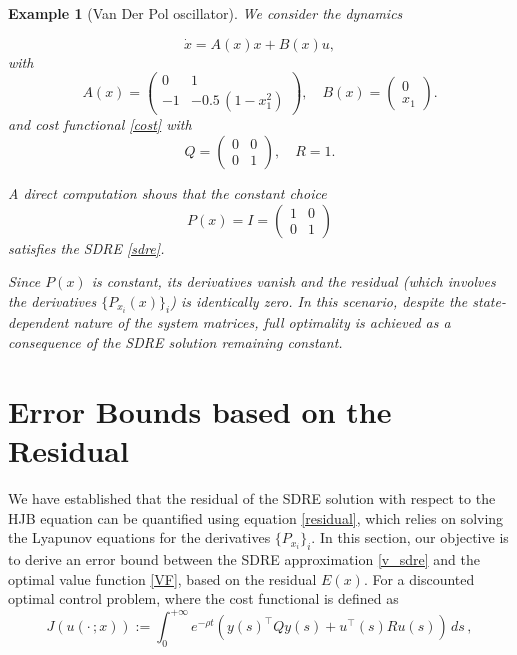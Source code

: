 \documentclass{article}
\newtheorem{example}{Example}[section]
\begin{document}
\begin{example}[Van Der Pol oscillator]
\label{ex:vdp}
We consider the dynamics

\[
\dot{x}=A(x)x+B(x)u,
\]
with
\[
A(x)=\begin{pmatrix}0 & 1\\[1mm]-1 & -0.5\,(1-x_1^2)\end{pmatrix},\quad B(x)=\begin{pmatrix}0\\ x_1\end{pmatrix}.
\]
and cost functional \eqref{cost} with
\[
Q=\begin{pmatrix}0 & 0\\[1mm]0 & 1\end{pmatrix},\quad R=1.
\]


A direct computation shows that the constant choice
\[
P(x)=I=\begin{pmatrix}1&0\\[1mm]0&1\end{pmatrix}
\]
satisfies the SDRE \eqref{sdre}. 

Since \(P(x)\) is constant, its derivatives vanish and the residual (which involves the derivatives $\{P_{x_i}(x)\}_i$) is identically zero. In this scenario, despite the state-dependent nature of the system matrices, full optimality is achieved as a consequence of the SDRE solution remaining constant.


\end{example}

















\section{Error Bounds based on the Residual}


We have established that the residual of the SDRE solution with respect to the HJB equation can be quantified using equation \eqref{residual}, which relies on solving the Lyapunov equations for the derivatives $\{P_{x_i}\}_i$. In this section, our objective is to derive an error bound between the SDRE approximation \eqref{v_sdre} and the optimal value function \eqref{VF}, based on the residual $E(x)$. For a discounted optimal control problem, where the cost functional is defined as
\begin{equation*}\label{cost2}
 J(u(\cdot \,;x)) := \int_0^{+\infty} e^{-\rho t}\left(y(s)^{\top} Q y(s) + u^{\top}(s) R u(s)\right) \,ds\,,
\end{equation*} 
\end{document}

